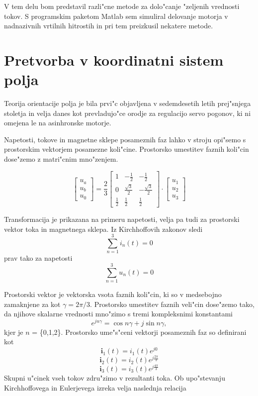 \documentclass[journal,a4paper,twoside]{sty/IEEEtran}
\begin{document}
V tem delu bom predstavil razli"cne metode za dolo"canje "zeljenih vrednosti tokov.
S programskim paketom Matlab sem simuliral delovanje motorja v nadnazivnih vrtilnih hitrostih in pri tem preizkusil nekatere metode.
\section{Pretvorba v koordinatni sistem polja}

Teorija orientacije polja je bila prvi"c objavljena v sedemdesetih letih prej"snjega stoletja in velja danes kot prevladujo"ce orodje za regulacijo servo pogonov, ki ni omejena le na asinhronske motorje.

Napetosti, tokove in magnetne sklepe posameznih faz lahko v stroju opi"semo s prostorskim vektorjem posamezne koli"cine. 
Prostorsko umestitev faznih koli"cin dose"zemo z matri"cnim mno"zenjem.

$$\begin{bmatrix}
u_a\\u_b\\u_0
\end{bmatrix}=
\frac{2}{3}
\begin{bmatrix} 1 & -\frac{1}{2} & -\frac{1}{2} \\ 0 & \frac{\sqrt{3}}{2} & -\frac{\sqrt{3}}{2}\\ \frac{1}{2} &\frac{1}{2} &\frac{1}{2} \end{bmatrix}\cdot
\begin{bmatrix}
u_{1}\\u_{2}\\u_{3}
\end{bmatrix}$$

Transformacija je prikazana na primeru napetosti, velja pa tudi za prostorski vektor toka in magnetnega sklepa.
Iz Kirchhoffovih zakonov sledi \begin{equation}
\sum_{n=1}^3 i_n(t)=0
\end{equation} prav tako za napetosti \begin{equation}
\sum_{n=1}^3 u_n(t)=0
\end{equation}



Prostorski vektor je vektorska vsota faznih koli"cin, ki so v medsebojno zamaknjene za kot  $\gamma=2 \pi/3$. Prostorsko umestitev faznih veli"cin dose"zemo tako, da njihove skalarne vrednosti mno"zimo s tremi kompleksnimi konstantami$$e^{j n \gamma}=\cos n \gamma +j \sin n \gamma,$$ kjer je $n$ = \{0,1,2\}. Prostorsko ume"s"ceni vektorji posameznih faz so definirani kot
$$\textbf{i}_1(t)=i_1(t) e^{j 0} $$ 
$$\textbf{i}_2(t)=i_2(t) e^{j \frac{2\pi}{3}} $$ 
$$\textbf{i}_3(t)=i_3(t) e^{j \frac{4\pi}{3}} $$
Skupni u"cinek vseh tokov zdru"zimo v rezultanti toka. Ob upo"stevanju Kirchhoffovega in Eulerjevega izreka velja naslednja relacija
\end{document}
